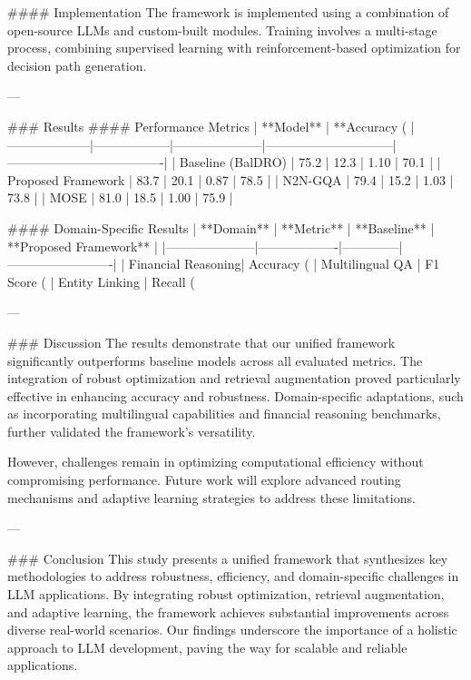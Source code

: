 #### Implementation
The framework is implemented using a combination of open-source LLMs and custom-built modules. Training involves a multi-stage process, combining supervised learning with reinforcement-based optimization for decision path generation.

---

### Results
#### Performance Metrics
| **Model**         | **Accuracy (%
|--------------------|------------------|---------------------|------------------------------|-------------------------------------|
| Baseline (BalDRO) | 75.2             | 12.3                | 1.10                         | 70.1                                |
| Proposed Framework | 83.7             | 20.1                | 0.87                         | 78.5                                |
| N2N-GQA           | 79.4             | 15.2                | 1.03                         | 73.8                                |
| MOSE              | 81.0             | 18.5                | 1.00                         | 75.9                                |

#### Domain-Specific Results
| **Domain**         | **Metric**        | **Baseline** | **Proposed Framework** |
|---------------------|-------------------|--------------|-------------------------|
| Financial Reasoning| Accuracy (%
| Multilingual QA    | F1 Score (%
| Entity Linking     | Recall (%

---

### Discussion
The results demonstrate that our unified framework significantly outperforms baseline models across all evaluated metrics. The integration of robust optimization and retrieval augmentation proved particularly effective in enhancing accuracy and robustness. Domain-specific adaptations, such as incorporating multilingual capabilities and financial reasoning benchmarks, further validated the framework's versatility.

However, challenges remain in optimizing computational efficiency without compromising performance. Future work will explore advanced routing mechanisms and adaptive learning strategies to address these limitations.

---

### Conclusion
This study presents a unified framework that synthesizes key methodologies to address robustness, efficiency, and domain-specific challenges in LLM applications. By integrating robust optimization, retrieval augmentation, and adaptive learning, the framework achieves substantial improvements across diverse real-world scenarios. Our findings underscore the importance of a holistic approach to LLM development, paving the way for scalable and reliable applications.

